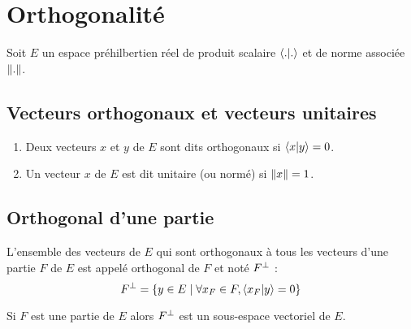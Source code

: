 \section{Orthogonalité}
Soit \(E\) un espace préhilbertien réel de produit scalaire \(\langle . | . \rangle\) et de norme associée \(\left\|.\right\|\).
\subsection{Vecteurs orthogonaux et vecteurs unitaires}
\begin{defprop}
    \begin{enumerate}
        \item Deux vecteurs \(x\) et \(y\) de \(E\) sont dits orthogonaux si \(\langle x | y \rangle = 0\).
        \item Un vecteur \(x\) de \(E\) est dit unitaire (ou normé) si \(\left\|x\right\| = 1\).
    \end{enumerate}
\end{defprop}
\subsection{Orthogonal d’une partie}
\begin{defi}
    L’ensemble des vecteurs de \(E\) qui sont orthogonaux à tous les vecteurs d’une partie \(F\) de \(E\) est appelé orthogonal de \(F\) et noté \(F^{\perp}\) :
    \[F^{\perp} = \left\lbrace y \in E \;\middle|\; \forall x_F \in F, \langle x_F | y \rangle = 0\right\rbrace \]
\end{defi}
\begin{defprop}
    Si \(F\) est une partie de \(E\) alors \(F^{\perp}\) est un sous-espace vectoriel de \(E\).
\end{defprop}
